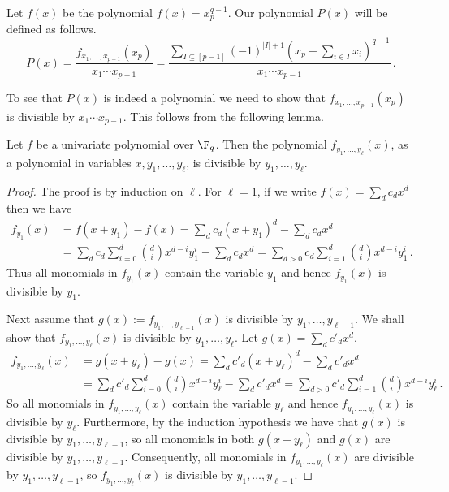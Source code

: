 Let $f(x)$ be the polynomial $f(x)=x_p^{q-1}$. Our polynomial $P(x)$ will be defined as follows.
\begin{equation}\label{eq:P(x)}
P(x) = \frac {f_{x_1,\ldots,x_{p-1}}(x_p)} {x_1 \cdots x_{p-1}} =
\frac {\sum_{I \subseteq [p-1]} (-1)^{|I|+1} (x_p + \sum_{i \in I} x_i)^{q-1}} {x_1 \cdots x_{p-1}}\,.
\end{equation}

To see that $P(x)$ is indeed a polynomial we need to show that $f_{x_1,\ldots,x_{p-1}}(x_p)$ is divisible by $x_1 \cdots x_{p-1}$. 
This  follows from the following lemma.

\begin{lemma}
Let $f$ be a univariate polynomial over $\F_q$. Then the polynomial $f_{y_1,\ldots,y_{\ell}}(x)$, as a polynomial in variables $x,y_1,\ldots,y_\ell$, is divisible by $y_1,\ldots,y_{\ell}$.
\end{lemma}

\begin{proof}
The proof is by induction on $\ell$. 
For $\ell =1$, if we write $f(x) = \sum_{d} c_d x^d$ then we have
%
\begin{align*}
f_{y_1}(x) & =  f(x+y_1) - f(x) = \sum_{d} c_d (x+y_1)^d - \sum_{d} c_d x^d \\
 & =   \sum_{d} c_d \sum_{i=0}^d \binom {d} {i} x^{d-i} y_1^{i} - \sum_{d} c_d x^d = \sum_{d >0} c_d \sum_{i=1}^d \binom {d} {i} x^{d-i} y_1^{i}\,.
\end{align*}
%
Thus all monomials in $f_{y_1}(x)$ contain the variable $y_1$ and hence $f_{y_1}(x)$ is divisible by $y_1$.

Next assume that $g(x):=f_{y_1,\ldots,y_{\ell -1}}(x)$ is divisible by $y_1,\ldots,y_{\ell-1}$. We shall show that $f_{y_1,\ldots,y_{\ell}}(x)$ is divisible by $y_1,\ldots,y_{\ell}$. Let $g(x)=\sum_{d} c'_d x^d$.
\begin{align*}
f_{y_1,\ldots,y_{\ell}}(x) & =  g(x+y_{\ell}) - g(x) = \sum_{d} c'_d (x+y_\ell)^d - \sum_{d} c'_d x^d \\
 & =   \sum_{d} c'_d \sum_{i=0}^d \binom {d} {i} x^{d-i} y_\ell^{i} - \sum_{d} c'_d x^d = \sum_{d >0} c'_d \sum_{i=1}^d \binom {d} {i} x^{d-i} y_\ell^{i}\,.
\end{align*}
So all monomials in $f_{y_1,\ldots,y_{\ell}}(x)$ contain the variable $y_\ell$ and hence $f_{y_1,\ldots,y_{\ell}}(x)$ is divisible by $y_\ell$. Furthermore, by the induction hypothesis we have that $g(x)$ is divisible by $y_1,\ldots,y_{\ell-1}$, so all monomials in both $g(x+y_{\ell})$ and $g(x)$ are divisible by $y_1,\ldots,y_{\ell-1}$. Consequently, all monomials in  $f_{y_1,\ldots,y_{\ell}}(x)$ are divisible by $y_1,\ldots,y_{\ell-1}$, so   $f_{y_1,\ldots,y_{\ell}}(x)$ is divisible by $y_1,\ldots,y_{\ell-1}$.
\end{proof}

